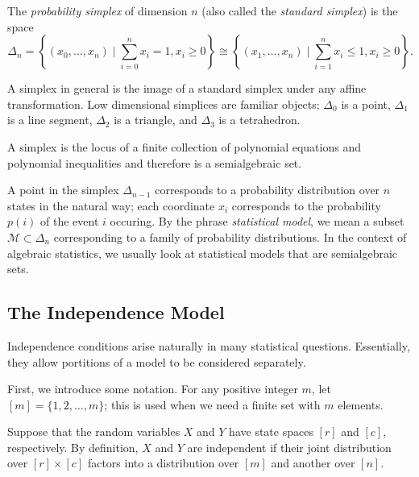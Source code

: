\documentclass[11pt,titlepage]{article}
\newcommand*{\Mod}{\mathcal{M}}
\newcommand*{\vbar}{\;\big\vert\;}
\begin{document}
    \begin{definition} The \emph{probability simplex} of dimension $n$ (also
    called the \emph{standard simplex}) is the space
    \[
        \Delta_{n} = 
        \left\{(x_0, \ldots, x_{n}) \vbar \sum_{i=0}^{n} x_i= 1, x_i \ge 0 \right\} 
        \cong 
        \left\{(x_1, \ldots, x_{n}) \vbar \sum_{i=1}^{n} x_i \le 1, x_i
        \ge 0 \right\}.
    \]
    \end{definition}
    A simplex in general is the image of a standard simplex under any affine
    transformation.  Low dimensional simplices are familiar objects; $\Delta_0$
    is a point, $\Delta_1$ is a line segment, $\Delta_2$ is a triangle,
    and $\Delta_3$ is a tetrahedron.
    \begin{center}
    \end{center}
    A simplex is the locus of a finite collection of polynomial equations and
    polynomial inequalities and therefore is a semialgebraic set.

    A point in the simplex $\Delta_{n-1}$ corresponds to a probability
    distribution over $n$ states in the natural way; each coordinate $x_i$
    corresponds to the probability $p(i)$ of the event $i$ occuring.  By the
    phrase \emph{statistical model}, we mean a subset $\Mod \subset \Delta_n$
    corresponding to a family of probability distributions.  In the context of
    algebraic statistics, we usually look at statistical models that are
    semialgebraic sets.

\subsection{The Independence Model}
    Independence conditions arise naturally in many statistical questions.
    Essentially, they allow portitions of a model to be considered separately.

    First, we introduce some notation.  For any positive integer $m$, let $[m] =
    \{1, 2, \ldots, m\}$; this is used when we need a finite set with $m$
    elements.

    Suppose that the random variables $X$ and $Y$ have state spaces $[r]$ and
    $[c]$, respectively.  By definition, $X$ and $Y$ are independent if their
    joint distribution over $[r] \times [c]$ factors into a distribution over
    $[m]$ and another over $[n]$.  
    
\end{document}
